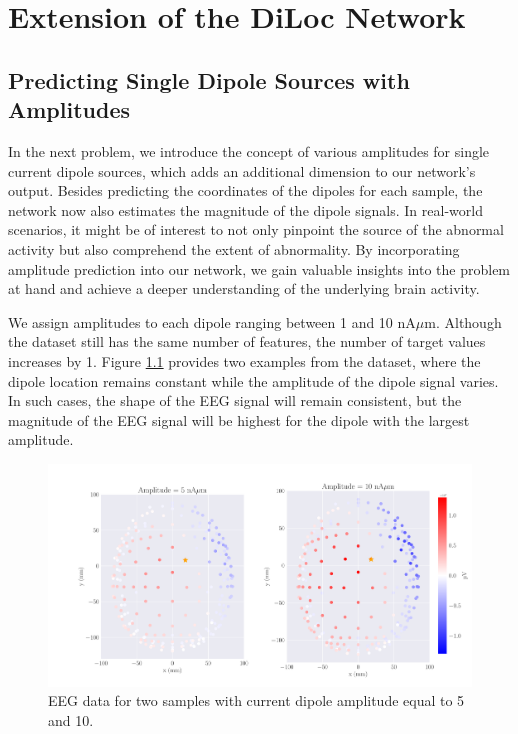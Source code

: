 \documentclass[a4paper, UKenglish, 11pt]{uiomaster}
\begin{document}
\chapter{Extension of the DiLoc Network}

\section{Predicting Single Dipole Sources with Amplitudes}

In the next problem, we introduce the concept of various amplitudes for single current dipole sources, which adds an additional dimension to our network's output. Besides predicting the coordinates of the dipoles for each sample, the network now also estimates the magnitude of the dipole signals. In real-world scenarios, it might be of interest to not only pinpoint the source of the abnormal activity but also comprehend the extent of abnormality. By incorporating amplitude prediction into our network, we gain valuable insights into the problem at hand and achieve a deeper understanding of the underlying brain activity.

We assign amplitudes to each dipole ranging between 1 and 10 nA$\mu$m. Although the dataset still has the same number of features, the number of target values increases by 1. Figure \ref{fig:dipole_w_amplitude_example} provides two examples from the dataset, where the dipole location remains constant while the amplitude of the dipole signal varies. In such cases, the shape of the EEG signal will remain consistent, but the magnitude of the EEG signal will be highest for the dipole with the largest amplitude.

\begin{figure}[!htb]
    \centering
    \includegraphics[width=\linewidth]{figures/dipole_w_amplitude_example.pdf}
    \caption{EEG data for two samples with current dipole amplitude equal to 5 and 10.}
    \label{fig:dipole_w_amplitude_example}
\end{figure}
\end{document}
